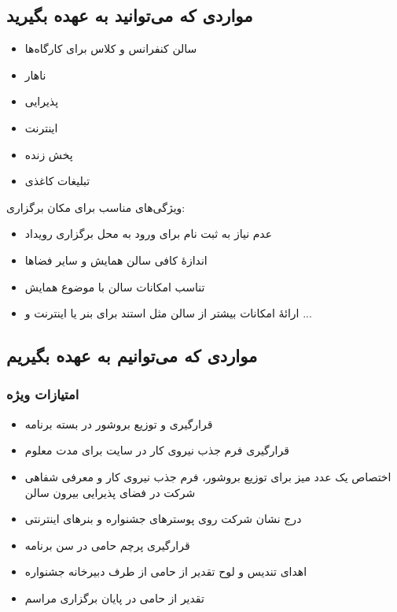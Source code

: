 \documentclass{article}
\begin{document}
\subsection{مواردی که می‌توانید به عهده بگیرید}


\begin{flushright}

\begin{itemize}
\item سالن کنفرانس و کلاس برای کارگاه‌ها
\item ناهار
\item پذیرایی
\item اینترنت
\item پخش زنده
\item تبلیغات کاغذی
\end{itemize}

\end{flushright}

\begin{flushright}

ویژگی‌های مناسب برای مکان برگزاری:

\begin{itemize}
\item عدم نیاز به ثبت نام برای ورود به محل برگزاری رویداد
\item اندازهٔ کافی سالن همایش و سایر فضاها
\item تناسب امکانات سالن با موضوع همایش
\item ارائهٔ امکانات بیشتر از سالن مثل استند برای بنر یا اینترنت و ... 
\end{itemize}

\end{flushright}

\subsection{مواردی که می‌توانیم به عهده بگیریم}

\subsubsection{امتیازات ویژه}

\begin{flushright}
\begin{itemize}
\item قرارگیری و توزیع بروشور در بسته برنامه
\item قرارگیری فرم جذب نیروی کار در سایت برای مدت معلوم
\item اختصاص یک عدد میز برای توزیع بروشور، فرم جذب نیروی کار و معرفی شفاهی شرکت در فضای پذیرایی بیرون سالن
\item درج نشان شرکت روی پوسترهای جشنواره و بنرهای اینترنتی
\item قرارگیری پرچم حامی در سن برنامه
\item اهدای تندیس و لوح تقدیر از حامی از طرف دبیرخانه جشنواره
\item تقدیر از حامی در پایان برگزاری مراسم
\end{itemize}
\end{flushright}
\end{document}
